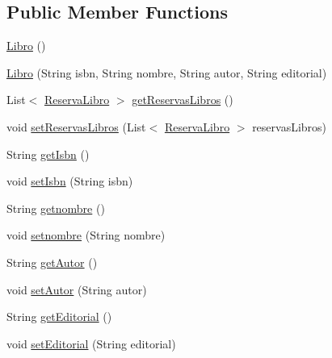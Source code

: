 \subsection*{Public Member Functions}
\begin{DoxyCompactItemize}
\item 
\mbox{\hyperlink{classes_1_1deusto_1_1spq_1_1biblioteca_1_1data_1_1_libro_ac8e8a4f99d8f310bd3685559c3871511}{Libro}} ()
\item 
\mbox{\hyperlink{classes_1_1deusto_1_1spq_1_1biblioteca_1_1data_1_1_libro_abc476b8b9deff9700ad05fbf3c85f06e}{Libro}} (String isbn, String nombre, String autor, String editorial)
\item 
List$<$ \mbox{\hyperlink{classes_1_1deusto_1_1spq_1_1biblioteca_1_1data_1_1_reserva_libro}{Reserva\+Libro}} $>$ \mbox{\hyperlink{classes_1_1deusto_1_1spq_1_1biblioteca_1_1data_1_1_libro_ae9f3b6584e5e7d12a44f16ba076f22f8}{get\+Reservas\+Libros}} ()
\item 
void \mbox{\hyperlink{classes_1_1deusto_1_1spq_1_1biblioteca_1_1data_1_1_libro_aaee59e81f8e43abc1088ac306b812d89}{set\+Reservas\+Libros}} (List$<$ \mbox{\hyperlink{classes_1_1deusto_1_1spq_1_1biblioteca_1_1data_1_1_reserva_libro}{Reserva\+Libro}} $>$ reservas\+Libros)
\item 
String \mbox{\hyperlink{classes_1_1deusto_1_1spq_1_1biblioteca_1_1data_1_1_libro_a8cb61b4acf568ba35e27fbb13d20bc82}{get\+Isbn}} ()
\item 
void \mbox{\hyperlink{classes_1_1deusto_1_1spq_1_1biblioteca_1_1data_1_1_libro_aa9ae0649fe11bf96d03d3de93638ac47}{set\+Isbn}} (String isbn)
\item 
String \mbox{\hyperlink{classes_1_1deusto_1_1spq_1_1biblioteca_1_1data_1_1_libro_a9e03d89691d2549ee6702b801ad09e32}{getnombre}} ()
\item 
void \mbox{\hyperlink{classes_1_1deusto_1_1spq_1_1biblioteca_1_1data_1_1_libro_a46e4d899a426e535f86fc40d1995f674}{setnombre}} (String nombre)
\item 
String \mbox{\hyperlink{classes_1_1deusto_1_1spq_1_1biblioteca_1_1data_1_1_libro_ae42d9e4ed794f598f4d05dcdb7c307d5}{get\+Autor}} ()
\item 
void \mbox{\hyperlink{classes_1_1deusto_1_1spq_1_1biblioteca_1_1data_1_1_libro_acad30600304a2c4ccb3d5e76d78f8b38}{set\+Autor}} (String autor)
\item 
String \mbox{\hyperlink{classes_1_1deusto_1_1spq_1_1biblioteca_1_1data_1_1_libro_a246aede47ebda75d4ea896995573ab5b}{get\+Editorial}} ()
\item 
void \mbox{\hyperlink{classes_1_1deusto_1_1spq_1_1biblioteca_1_1data_1_1_libro_a0624fed24dc3c65c673da331827534b1}{set\+Editorial}} (String editorial)

\end{DoxyCompactItemize}
